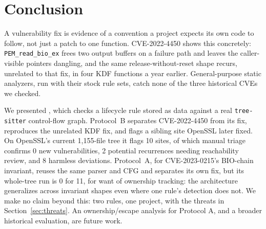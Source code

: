 \section{Conclusion}
\label{sec:conclusion}

A vulnerability fix is evidence of a convention a project expects its own
code to follow, not just a patch to one function. CVE-2022-4450 shows
this concretely: \texttt{PEM\_read\_bio\_ex} frees two output buffers on
a failure path and leaves the caller-visible pointers dangling, and the
same release-without-reset shape recurs, unrelated to that fix, in four
KDF functions a year earlier. General-purpose static analyzers, run with
their stock rule sets, catch none of the three historical CVEs we
checked.

We presented \tool, which checks a lifecycle rule stored as data against
a real \texttt{tree-sitter} control-flow graph. Protocol~B separates
CVE-2022-4450 from its fix, reproduces the unrelated KDF fix, and flags a
sibling site OpenSSL later fixed. On OpenSSL's current 1{,}155-file tree it flags 10 sites,
of which manual triage confirms 0 new vulnerabilities, 2 potential
recurrences needing reachability review, and 8 harmless deviations.
Protocol~A, for CVE-2023-0215's BIO-chain invariant, reuses the same
parser and CFG and separates its own fix, but its whole-tree run is 0 for
11, for want of ownership tracking: the architecture generalizes across
invariant shapes even where one rule's detection does not. We make no claim beyond this: two rules, one project, with the
threats in Section~\ref{sec:threats}. An ownership/escape analysis for
Protocol A, and a broader historical evaluation, are future work.

